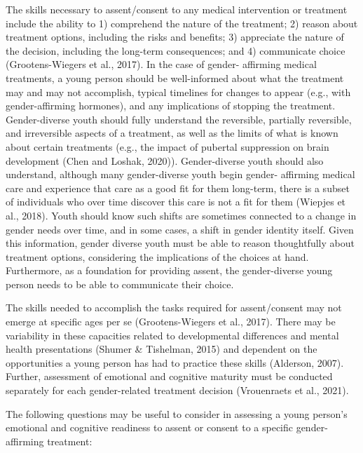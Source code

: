 \documentclass[
]{book}
\begin{document}
The skills necessary to assent/consent to any
medical intervention or treatment include the
ability to 1) comprehend the nature of the treatment; 2) reason about treatment options, including the risks and benefits; 3) appreciate the nature
of the decision, including the long-term consequences; and 4) communicate choice
(Grootens-Wiegers et al., 2017). In the case of
gender- affirming medical treatments, a young
person should be well-informed about what the
treatment may and may not accomplish, typical
timelines for changes to appear (e.g., with
gender-affirming hormones), and any implications
of stopping the treatment. Gender-diverse youth
should fully understand the reversible, partially
reversible, and irreversible aspects of a treatment,
as well as the limits of what is known about certain treatments (e.g., the impact of pubertal suppression on brain development (Chen and Loshak,
2020)). Gender-diverse youth should also understand, although many gender-diverse youth begin
gender- affirming medical care and experience
that care as a good fit for them long-term, there
is a subset of individuals who over time discover
this care is not a fit for them (Wiepjes et al.,
2018). Youth should know such shifts are sometimes connected to a change in gender needs over
time, and in some cases, a shift in gender identity
itself. Given this information, gender diverse
youth must be able to reason thoughtfully about
treatment options, considering the implications of
the choices at hand. Furthermore, as a foundation
for providing assent, the gender-diverse young
person needs to be able to communicate
their choice.

The skills needed to accomplish the tasks
required for assent/consent may not emerge at
specific ages per se (Grootens-Wiegers et al.,
2017). There may be variability in these capacities
related to developmental differences and mental
health presentations (Shumer \& Tishelman, 2015)
and dependent on the opportunities a young person has had to practice these skills (Alderson,
2007). Further, assessment of emotional and cognitive maturity must be conducted separately for
each gender-related treatment decision
(Vrouenraets et al., 2021).

The following questions may be useful to consider in assessing a young person's emotional and
cognitive readiness to assent or consent to a specific gender-affirming treatment:
\end{document}
